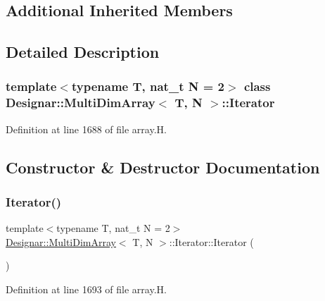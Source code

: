 \subsection*{Additional Inherited Members}


\subsection{Detailed Description}
\subsubsection*{template$<$typename T, nat\+\_\+t N = 2$>$\newline
class Designar\+::\+Multi\+Dim\+Array$<$ T, N $>$\+::\+Iterator}



Definition at line 1688 of file array.\+H.



\subsection{Constructor \& Destructor Documentation}
\mbox{\label{class_designar_1_1_multi_dim_array_1_1_iterator_af627beb86cf5b1154f421078082b18f9}} 
\subsubsection{\texorpdfstring{Iterator()}{Iterator()}\hspace{0.1cm}{\footnotesize\ttfamily [1/5]}}
{\footnotesize\ttfamily template$<$typename T, nat\+\_\+t N = 2$>$ \\
\hyperlink{class_designar_1_1_multi_dim_array}{Designar\+::\+Multi\+Dim\+Array}$<$ T, N $>$\+::Iterator\+::\+Iterator (\begin{DoxyParamCaption}{ }\end{DoxyParamCaption})\hspace{0.3cm}{\ttfamily [inline]}}



Definition at line 1693 of file array.\+H.

\mbox{\label{class_designar_1_1_multi_dim_array_1_1_iterator_a0b4865a27a5f64866d63376f24076b9f}} 
